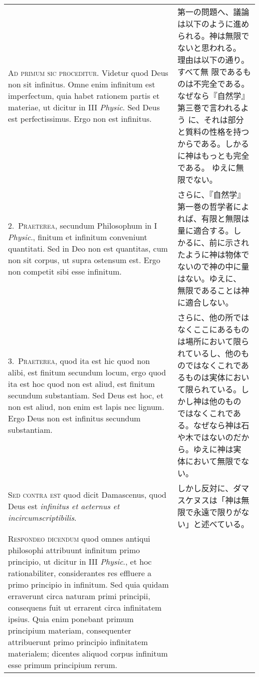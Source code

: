 \documentclass[10pt]{jsarticle} %
\begin{document}
\begin{longtable}{p{21em}p{21em}}


{\huge A}{\scshape d primum sic proceditur}. Videtur quod Deus non sit
infinitus. Omne enim infinitum est imperfectum, quia habet rationem
partis et materiae, ut dicitur in III {\itshape Physic}. Sed Deus est
perfectissimus. Ergo non est infinitus.

&

第一の問題へ、議論は以下のように進められる。神は無限でないと思われる。
 理由は以下の通り。すべて無
 限であるものは不完全である。なぜなら『自然学』第三巻で言われるよう
 に、それは部分と質料の性格を持つからである。しかるに神はもっとも完全である。
 ゆえに無限でない。


\\


2.~{\scshape Praeterea}, secundum Philosophum in I {\itshape Physic}., finitum et
infinitum conveniunt quantitati. Sed in Deo non est quantitas, cum non
sit corpus, ut supra ostensum est. Ergo non competit sibi esse
infinitum.

&

さらに、『自然学』第一巻の哲学者によれば、有限と無限は量に適合する。し
 かるに、前に示されたように神は物体でないので神の中に量はない。ゆえに、
 無限であることは神に適合しない。


\\


3.~{\scshape Praeterea}, quod ita est hic quod non alibi, est finitum secundum
locum, ergo quod ita est hoc quod non est aliud, est finitum secundum
substantiam. Sed Deus est hoc, et non est aliud, non enim est lapis nec
lignum. Ergo Deus non est infinitus secundum substantiam.

&

さらに、他の所ではなくここにあるものは場所において限られているし、他のも
 のではなくこれであるものは実体において限られている。しかし神は他のもの
 ではなくこれである。なぜなら神は石や木ではないのだから。ゆえに神は実
 体において無限でない。


\\


{\scshape Sed contra est} quod dicit Damascenus, quod Deus est {\itshape infinitus
et aeternus et incircumscriptibilis}.

&

しかし反対に、ダマスケヌスは「神は無限で永遠で限りがない」と述べている。


\\


{\scshape Respondeo dicendum} quod omnes antiqui philosophi attribuunt infinitum
primo principio, ut dicitur in III {\itshape Physic}., et hoc rationabiliter,
considerantes res effluere a primo principio in infinitum. Sed quia
quidam erraverunt circa naturam primi principii, consequens fuit ut
errarent  circa infinitatem ipsius. Quia enim ponebant primum principium
materiam, consequenter attribuerunt primo principio infinitatem
materialem; dicentes aliquod corpus infinitum esse primum principium
rerum.


\end{longtable}
\end{document}
